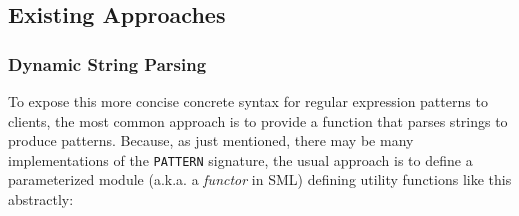 

\subsection{Existing Approaches}\label{sec:syntax-existing}
\subsubsection{Dynamic String Parsing}
To expose this more concise concrete syntax for regular expression patterns to clients, the most common approach is to provide a function that parses strings to produce patterns. Because, as just mentioned, there  may be many implementations of the \lstinline{PATTERN} signature, the usual approach is to define a parameterized module (a.k.a. a \emph{functor} in SML) defining utility functions like this abstractly:

